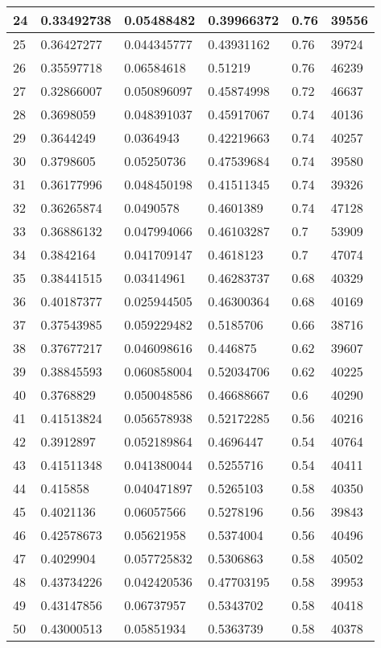 \begin{longtable}{|l|l|l|l|l|l|}
24 & 0.33492738 & 0.05488482 & 0.39966372 & 0.76 & 39556 \\ \hline 
25 & 0.36427277 & 0.044345777 & 0.43931162 & 0.76 & 39724 \\ \hline 
26 & 0.35597718 & 0.06584618 & 0.51219 & 0.76 & 46239 \\ \hline 
27 & 0.32866007 & 0.050896097 & 0.45874998 & 0.72 & 46637 \\ \hline 
28 & 0.3698059 & 0.048391037 & 0.45917067 & 0.74 & 40136 \\ \hline 
29 & 0.3644249 & 0.0364943 & 0.42219663 & 0.74 & 40257 \\ \hline 
30 & 0.3798605 & 0.05250736 & 0.47539684 & 0.74 & 39580 \\ \hline 
31 & 0.36177996 & 0.048450198 & 0.41511345 & 0.74 & 39326 \\ \hline 
32 & 0.36265874 & 0.0490578 & 0.4601389 & 0.74 & 47128 \\ \hline 
33 & 0.36886132 & 0.047994066 & 0.46103287 & 0.7 & 53909 \\ \hline 
34 & 0.3842164 & 0.041709147 & 0.4618123 & 0.7 & 47074 \\ \hline 
35 & 0.38441515 & 0.03414961 & 0.46283737 & 0.68 & 40329 \\ \hline 
36 & 0.40187377 & 0.025944505 & 0.46300364 & 0.68 & 40169 \\ \hline 
37 & 0.37543985 & 0.059229482 & 0.5185706 & 0.66 & 38716 \\ \hline 
38 & 0.37677217 & 0.046098616 & 0.446875 & 0.62 & 39607 \\ \hline 
39 & 0.38845593 & 0.060858004 & 0.52034706 & 0.62 & 40225 \\ \hline 
40 & 0.3768829 & 0.050048586 & 0.46688667 & 0.6 & 40290 \\ \hline 
41 & 0.41513824 & 0.056578938 & 0.52172285 & 0.56 & 40216 \\ \hline 
42 & 0.3912897 & 0.052189864 & 0.4696447 & 0.54 & 40764 \\ \hline 
43 & 0.41511348 & 0.041380044 & 0.5255716 & 0.54 & 40411 \\ \hline 
44 & 0.415858 & 0.040471897 & 0.5265103 & 0.58 & 40350 \\ \hline 
45 & 0.4021136 & 0.06057566 & 0.5278196 & 0.56 & 39843 \\ \hline 
46 & 0.42578673 & 0.05621958 & 0.5374004 & 0.56 & 40496 \\ \hline 
47 & 0.4029904 & 0.057725832 & 0.5306863 & 0.58 & 40502 \\ \hline 
48 & 0.43734226 & 0.042420536 & 0.47703195 & 0.58 & 39953 \\ \hline 
49 & 0.43147856 & 0.06737957 & 0.5343702 & 0.58 & 40418 \\ \hline 
50 & 0.43000513 & 0.05851934 & 0.5363739 & 0.58 & 40378 \\ \hline 
\end{longtable}